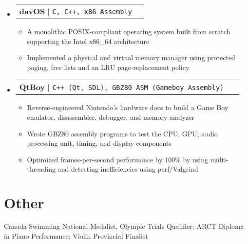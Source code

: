 \documentclass[letterpaper,10pt]{article}
\makeatletter
\newcommand{\resumeItem}[1]{
  \item\small{
    {#1 \vspace{-2pt}}
  }
}
\newcommand{\resumeProjectHeading}[2]{
    \item
    \begin{tabular*}{0.97\textwidth}{l@{\extracolsep{\fill}}r}
      \small#1 & #2 \\
    \end{tabular*}\vspace{-7pt}
}
\newcommand{\resumeSubHeadingListStart}{\begin{itemize}[leftmargin=0.15in, label={}]}
\newcommand{\resumeSubHeadingListEnd}{\end{itemize}}
\newcommand{\resumeItemListStart}{\begin{itemize}}
\newcommand{\resumeItemListEnd}{\end{itemize}\vspace{-5pt}}
\makeatother
\begin{document}
    \resumeSubHeadingListStart
      \resumeProjectHeading
          {\textbf{davOS}
            \href{https://github.com/davidtranhq/davOS}{\faicon{github}}
            $|$ \texttt{C, C++, x86 Assembly}
          }{}
          \resumeItemListStart
            \resumeItem{ A monolithic POSIX-compliant operating system built from scratch supporting the Intel x86\_64 architecture}
            \resumeItem{ Implemented a physical and virtual memory manager using protected paging, free lists and an LRU page-replacement policy }
          \resumeItemListEnd
      \resumeProjectHeading
          {\textbf{QtBoy}
            \href{https://github.com/davidtranhq/qtboy}{\faicon{github}}
            $|$ \texttt{C++ (Qt, SDL), GBZ80 ASM (Gameboy Assembly) }
          }{}
          \resumeItemListStart
            \resumeItem{ Reverse-engineered Nintendo's hardware docs to build a Game Boy emulator, disassembler, debugger, and memory analyzer}
            \resumeItem{ Wrote GBZ80 assembly programs to test the CPU, GPU, audio processing unit, timing, and display components}
            \resumeItem{ Optimized frames-per-second performance by 100\% by using multi-threading and detecting inefficiencies using perf/Valgrind }
          \resumeItemListEnd



    \resumeSubHeadingListEnd


\section{Other}
\begin{itemize}[leftmargin=0.15in, label={}]
   \small{\item{
    {Canada Swimming National Medalist, Olympic Trials Qualifier; ARCT Diploma in Piano Performance}; Violin Provincial Finalist}}
\end{itemize}
\end{document}
